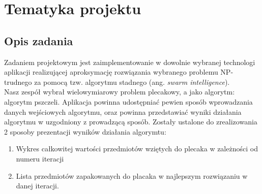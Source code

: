 \documentclass[a4paper,12pt,notitlepage]{mwrep}
\begin{document}
\onehalfspacing


\rfoot{\scriptsize{\wersja}}
\setcounter{secnumdepth}{2}

\setcounter{tocdepth}{2}


\vfill
\begin{center}
\singlespacing
{}
\onehalfspacing
\end{center}

\tableofcontents

\chapter{Tematyka projektu}
\section{Opis zadania}
Zadaniem projektowym jest zaimplementowanie w dowolnie wybranej technologi aplikacji
realizującej aproksymację rozwiązania wybranego problemu NP-trudnego
za pomocą tzw. algorytmu stadnego (ang. \emph{swarm intelligence}).\\
Nasz zespół wybrał wielowymiarowy problem plecakowy, a jako algorytm:
algorytm pszczeli.
Aplikacja powinna udostępniać pewien sposób wprowadzania danych wejściowych algorytmu,
oraz powinna przedstawiać wyniki działania algorytmu w uzgodniony z prowadzącą sposób.\de
Zostały ustalone do zrealizowania 2 sposoby prezentacji wyników działania algorymtu:
\begin{enumerate}
	\item	Wykres całkowitej wartości przedmiotów wziętych do plecaka
			w zależności od numeru iteracji
	\item	Lista przedmiotów zapakowanych do placaka w najlepszym rozwiązaniu
		w danej iteracji.
\end{enumerate}
\end{document}
